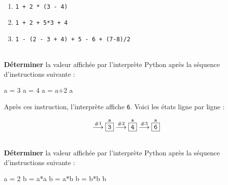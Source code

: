 \documentclass[a4paper,17pt]{extarticle}
\newenvironment{eleve}%
{\begin{activite}\color{noiramu}\\[-0.5cm]}
{\end{activite}}
\providecommand{\tightlist}{%
      \setlength{\itemsep}{0pt}\setlength{\parskip}{0pt}}
\newenvironment{Shaded}{}{}
\newcommand{\DecValTok}[1]{\textcolor[rgb]{0.25,0.63,0.44}{{#1}}}
\newcommand{\NormalTok}[1]{{#1}}
\newcommand{\OperatorTok}[1]{\textcolor[rgb]{0.40,0.40,0.40}{{#1}}}
\begin{document}
\begin{eleve}
        \end{eleve}\begin{reponse}
    \begin{enumerate}
\def\labelenumi{\arabic{enumi}.}
\tightlist
\item
  \texttt{1\ +\ 2\ *\ (3\ -\ 4)}
\item
  \texttt{1\ +\ 2\ +\ 5*3\ +\ 4}
\item
  \texttt{1\ -\ (2\ -\ 3\ +\ 4)\ +\ 5\ -\ 6\ +\ (7-8)/2}
\end{enumerate}

        \end{reponse}\begin{eleve}
    \textbf{Déterminer} la valeur affichée par l'interprète Python après la
séquence d'instructions suivante :

\begin{Shaded}
\begin{Highlighting}[]
\NormalTok{a }\OperatorTok{=} \DecValTok{3}
\NormalTok{a }\OperatorTok{=} \DecValTok{4}
\NormalTok{a }\OperatorTok{=}\NormalTok{ a}\OperatorTok{+}\DecValTok{2}
\NormalTok{a}
\end{Highlighting}
\end{Shaded}
        
        \end{eleve}\begin{reponse}
    Après ces instruction, l'interprète affiche \texttt{6}. Voici les états
ligne par ligne :

\[
\overset{\text{\#1}}\longrightarrow
\overset{\texttt{a}}{\fbox{\texttt{3}}}
\overset{\text{\#2}}\longrightarrow
\overset{\texttt{a}}{\fbox{\texttt{4}}}
\overset{\text{\#3}}\longrightarrow
\overset{\texttt{a}}{\fbox{\texttt{6}}}
\]

        \end{reponse}\begin{eleve}
    \textbf{Déterminer} la valeur affichée par l'interprète Python après la
séquence d'instructions suivante :

\begin{Shaded}
\begin{Highlighting}[]
\NormalTok{a }\OperatorTok{=} \DecValTok{2}
\NormalTok{b }\OperatorTok{=}\NormalTok{ a}\OperatorTok{*}\NormalTok{a}
\NormalTok{b }\OperatorTok{=}\NormalTok{ a}\OperatorTok{*}\NormalTok{b}
\NormalTok{b }\OperatorTok{=}\NormalTok{ b}\OperatorTok{*}\NormalTok{b}
\NormalTok{b}
\end{Highlighting}
\end{Shaded}
        

\end{eleve}
\end{document}

